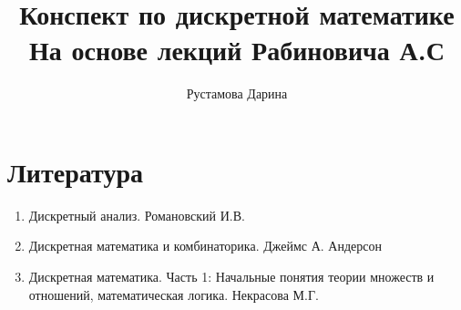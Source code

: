 \documentclass[12pt]{report}
\title{
    Конспект по дискретной математике \\ 
    \large На основе лекций Рабиновича А.С
}
\author{
    Рустамова Дарина
}
\date{\the\year}
\begin{document}
\maketitle
\tableofcontents

\newcommand\shortlorem{}

\newpage
% 














\chapter*{Литература}   
\begin{enumerate}
    \item Дискретный анализ. Романовский И.В.
    \item Дискретная математика и комбинаторика. Джеймс А. Андерсон
    \item Дискретная математика. Часть 1: Начальные понятия теории множеств и отношений,
    математическая логика. Некрасова М.Г.
\end{enumerate}

\shortlorem
\end{document}
